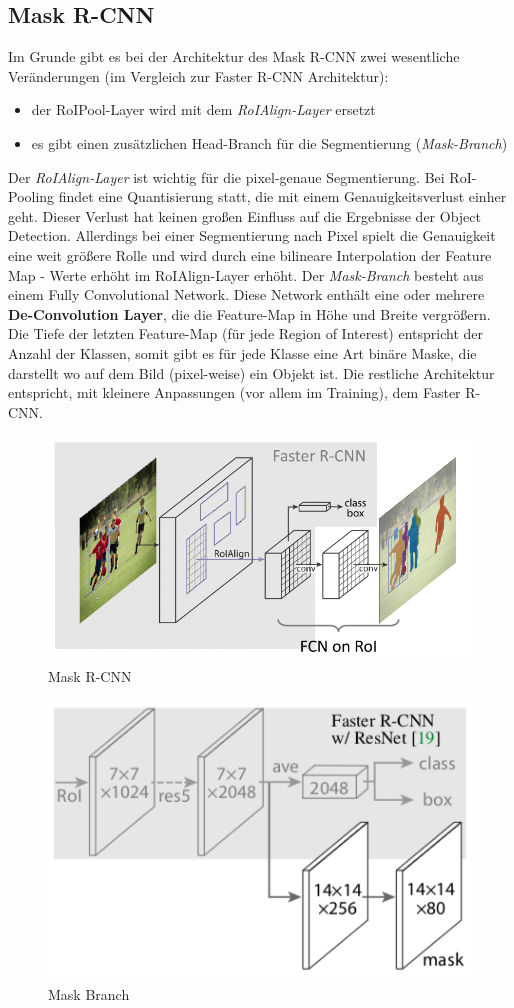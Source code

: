 \subsection{Mask R-CNN}\label{subsec:maskrcnn}
 Im Grunde gibt es bei der Architektur des Mask R-CNN zwei wesentliche Veränderungen (im Vergleich zur Faster R-CNN Architektur):
\begin{itemize}
    \item der RoIPool-Layer wird mit dem \textit{RoIAlign-Layer} ersetzt
    \item es gibt einen zusätzlichen Head-Branch für die Segmentierung (\textit{Mask-Branch})
\end{itemize}
Der \textit{RoIAlign-Layer} ist wichtig für die pixel-genaue Segmentierung. Bei RoI-Pooling findet eine Quantisierung statt, die mit einem Genauigkeitsverlust einher geht. Dieser Verlust hat keinen großen Einfluss auf die Ergebnisse der Object Detection. Allerdings bei einer Segmentierung nach Pixel spielt die Genauigkeit eine weit größere Rolle und wird durch eine bilineare Interpolation der Feature Map - Werte erhöht im RoIAlign-Layer erhöht.
Der \textit{Mask-Branch} besteht aus einem Fully Convolutional Network. Diese Network enthält eine oder mehrere \textbf{De-Convolution Layer}, die die Feature-Map in Höhe und Breite vergrößern. Die Tiefe der letzten Feature-Map (für jede Region of Interest) entspricht der Anzahl der Klassen, somit gibt es für jede Klasse eine Art binäre Maske, die darstellt wo auf dem Bild (pixel-weise) ein Objekt ist.
Die restliche Architektur entspricht, mit kleinere Anpassungen (vor allem im Training), dem Faster R-CNN.
\begin{figure}[h]
  \includegraphics[width=.4\linewidth]{imgs/mask_rcnn.png}
  \caption{Mask R-CNN\cite{maskrcnnPresentation}}
\end{figure}
\label{img:mask_rcnn}
\begin{figure}[h]
  \includegraphics[width=.4\linewidth]{imgs/mask_branch.png}
  \caption{Mask Branch\cite{maskrcnn}}
\end{figure}
\label{img:mask_branch}

\newpage

